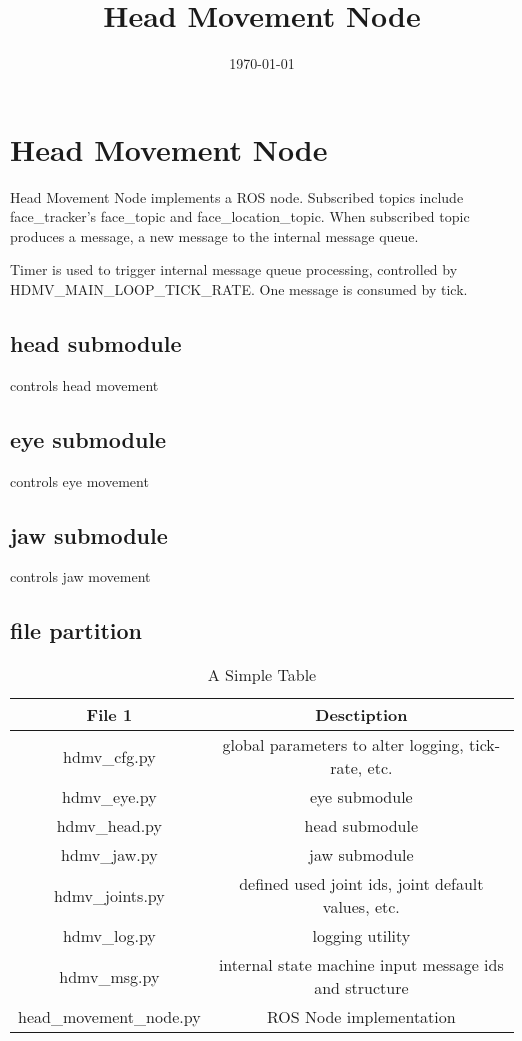 \documentclass[11pt]{article}
\date{\today}
\title{Head Movement Node}
\begin{document}
\maketitle
\tableofcontents

\section{Head Movement Node}

Head Movement Node implements a ROS node. Subscribed topics include face_tracker's face_topic and face_location_topic. When subscribed topic produces a message, a new message to the internal message queue.

Timer is used to trigger internal message queue processing, controlled by HDMV_MAIN_LOOP_TICK_RATE. One message is consumed by tick.

\subsection{head submodule}
controls head movement

\subsection{eye submodule}
controls eye movement

\subsection{jaw submodule}
controls jaw movement

\subsection{file partition}

\begin{table}[htbp]
  \centering
  \begin{tabular}{|c|c|}
    \hline
    File 1 & Desctiption \\
    \hline
    hdmv_cfg.py & global parameters to alter logging, tick-rate, etc.\\
    \hline
    hdmv_eye.py & eye submodule \\
    \hline
    hdmv_head.py & head submodule \\
    \hline
    hdmv_jaw.py & jaw submodule \\
    \hline
    hdmv_joints.py & defined used joint ids, joint default values, etc. \\
    \hline
    hdmv_log.py & logging utility \\
    \hline
    hdmv_msg.py & internal state machine input message ids and structure \\
    \hline
    head_movement_node.py & ROS Node implementation \\
    \hline

  \end{tabular}
  \caption{A Simple Table}
  \label{tab:simple}
\end{table}
\end{document}
